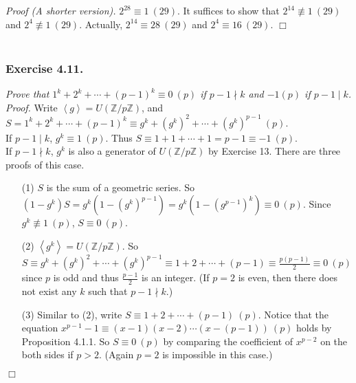 \documentclass{article}
\begin{document}
\emph{Proof (A shorter version).}
$2^{28} \equiv 1 \: (29)$.
It suffices to show that
$2^{14} \not\equiv 1 \: (29)$ and $2^{4} \not\equiv 1 \: (29)$.
Actually, $2^{14} \equiv 28 \: (29)$ and $2^{4} \equiv 16 \: (29)$.
$\Box$ \\\\






\subsubsection*{Exercise 4.11.}
\emph{Prove that $1^k + 2^k + \cdots + (p-1)^k \equiv 0 \: (p)$
if $p - 1 \nmid k$ and $-1 (p)$ if $p - 1 \mid k$.} \\

\emph{Proof.}
Write $\left \langle g \right \rangle = U(\mathbb{Z}/p\mathbb{Z})$, and
$S = 1^k + 2^k + \cdots + (p-1)^k \equiv g^k + (g^k)^2 + \cdots + (g^k)^{p - 1} \: (p)$. \\

If $p - 1 \mid k$, $g^k \equiv 1 \: (p)$. Thus
$S \equiv 1 + 1 + \cdots + 1 = p - 1 \equiv -1 \: (p)$. \\

If $p - 1 \nmid k$, $g^k$ is also a generator of $U(\mathbb{Z}/p\mathbb{Z})$ by Exercise 13.
There are three proofs of this case.
\begin{enumerate}
\item[(1)]
$S$ is the sum of a geometric series.
So $(1 - g^k) S = g^k (1 - (g^k)^{p - 1}) = g^k (1 - (g^{p - 1})^k) \equiv 0 \: (p)$.
Since $g^k \not\equiv 1 \: (p)$, $S \equiv 0 \: (p)$.
\item[(2)]
$\left \langle g^k \right \rangle = U(\mathbb{Z}/p\mathbb{Z})$. So
$S \equiv g^k + (g^k)^2 + \cdots + (g^k)^{p - 1} \equiv 1 + 2 + \cdots + (p - 1)
\equiv \frac{p(p - 1)}{2} \equiv 0 \: (p)$ since $p$ is odd and
thus $\frac{p - 1}{2}$ is an integer.
(If $p = 2$ is even, then there does not exist any $k$ such that $p - 1 \nmid k$.)
\item[(3)]
Similar to (2), write $S \equiv 1 + 2 + \cdots + (p - 1) \: (p)$. Notice that the equation
$x^{p - 1} - 1 \equiv (x - 1)(x - 2) \cdots (x - (p - 1)) \: (p)$ holds by Proposition 4.1.1.
So $S \equiv 0 \: (p)$ by comparing the coefficient of $x^{p - 2}$ on the both sides if $p > 2$.
(Again $p = 2$ is impossible in this case.)
\end{enumerate}
$\Box$ \\\\
\end{document}
